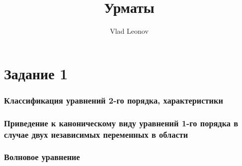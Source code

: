 

\hypersetup{
    colorlinks=true,
    linkcolor=red,
    filecolor=magenta,      
    urlcolor=cyan,
    pdfpagemode=FullScreen,
    }

\setcounter{secnumdepth}{0}

\author{Vlad Leonov}
\title{Урматы}

\maketitle
\tableofcontents
\newpage
\part{Задание 1}
\section{Классификация уравнений 2-го порядка, характеристики}


\section{Приведение к каноническому виду уравнений 1-го порядка в случае двух независимых переменных
в области}

\newpage

\section{Волновое уравнение}


